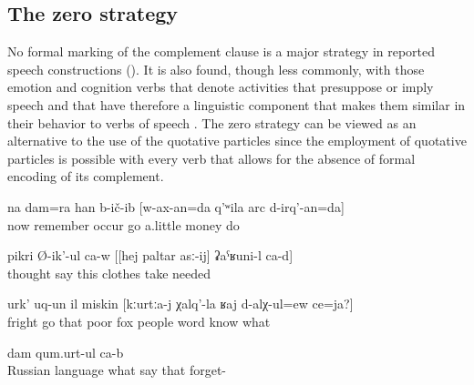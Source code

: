 
\subsection{The zero strategy}
\label{ssec:The zero strategy}

No formal marking of the complement clause is a major strategy in reported speech constructions (). It is also found, though less commonly, with those emotion and cognition verbs that denote activities that presuppose or imply speech and that have therefore a linguistic component that makes them similar in their behavior to verbs of speech . The zero strategy can be viewed as an alternative to the use of the quotative particles since the employment of quotative particles is possible with every verb that allows for the absence of formal encoding of its complement.
%
\begin{exe}
	\ex	\label{ex:‎I also thought, I should go to make a little money}
	\gll	na	dam=ra	han	b-ič-ib	[w-ax-an=da	q'ʷila	arc	d-irq'-an=da]\\
		now		remember	occur	go	a.little	money	do\\
	\glt	{}

	\ex	\label{ex:‎He thinks, I need to take these clothes}
	\gll	pikri	Ø-ik'-ul	ca-w	[[hej	paltar	asː-ij]	ʡaˁʁuni-l	ca-d]\\
		thought	say		this	clothes	take	needed	\\
	\glt	{}

		\ex	\label{ex:‎‎‎The poor boy got frightened}
	\gll	urk'	uq-un	il	miskin	[kːurtːa-j	χalq'-la	ʁaj	d-alχ-ul=ew	ce=ja?]\\
		fright	go	that	poor	fox	people	word	know	what\\
	\glt	{}
	
	\ex	\label{ex:‎It is called something in Russian, I forgot}
	\gll	[ʡuˁrus	ʁaj-la	ce=jal	b-ik'-ul	ca-b	it-i-j]	dam	qum.urt-ul	ca-b\\
		Russian	language	what	say		that		forget-	\\
	\glt	{}
\end{exe}

